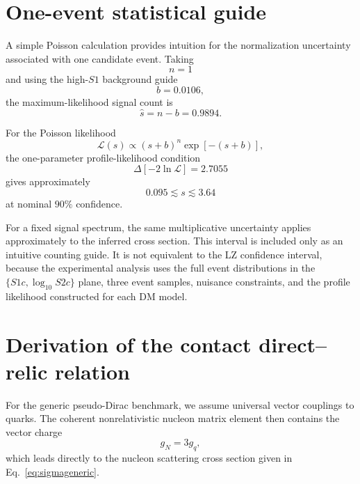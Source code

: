 \documentclass[aps,prd,reprint,superscriptaddress,nofootinbib,longbibliography,floatfix]{revtex4-2}
\begin{document}
\section{One-event statistical guide}
\label{app:poisson}

A simple Poisson calculation provides intuition for the normalization uncertainty associated with one candidate event. Taking
\begin{equation}
n=1
\end{equation}
and using the high-$S1$ background guide
\begin{equation}
b=0.0106,
\end{equation}
the maximum-likelihood signal count is
\begin{equation}
\hat s=n-b=0.9894.
\end{equation}

For the Poisson likelihood
\begin{equation}
\mathcal{L}(s)
\propto
(s+b)^n
\exp[-(s+b)],
\end{equation}
the one-parameter profile-likelihood condition
\begin{equation}
\Delta
\left[
-2\ln\mathcal{L}
\right]
=
2.7055
\end{equation}
gives approximately
\begin{equation}
0.095
\lesssim
s
\lesssim
3.64
\end{equation}
at nominal $90\%$ confidence.

For a fixed signal spectrum, the same multiplicative uncertainty applies approximately to the inferred cross section. This interval is included only as an intuitive counting guide. It is not equivalent to the LZ confidence interval, because the experimental analysis uses the full event distributions in the $\{S1c,\log_{10}S2c\}$ plane, three event samples, nuisance constraints, and the profile likelihood constructed for each DM model.


\section{Derivation of the contact direct--relic relation}
\label{app:direct_relic}

For the generic pseudo-Dirac benchmark, we assume universal vector couplings to quarks. The coherent nonrelativistic nucleon matrix element then contains the vector charge
\begin{equation}
g_N=3g_q,
\end{equation}
which leads directly to the nucleon scattering cross section given in Eq.~\eqref{eq:sigmageneric}.
\end{document}
